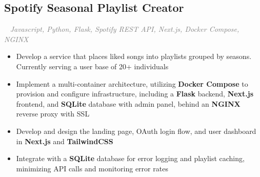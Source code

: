 \documentclass{article}
\newcommand{\projectsection}[3]{
    \subsection*{#1}
    \ 
    \small
    \textcolor{grey}{\emph{#2}}
    \normalsize
    \hfill
    \textcolor{black}{#3}
    \small
}
\begin{document}
\projectsection{Spotify Seasonal Playlist Creator}{Javascript, Python, Flask, Spotify REST API, Next.js, Docker Compose, NGINX}{}
\begin{itemize}
    \item Develop a service that places liked songs into playlists grouped by seasons. Currently serving a user base of 20+ individuals
    \item Implement a multi-container architecture, utilizing \textbf{Docker Compose} to provision and configure infrastructure, including a \textbf{Flask} backend, \textbf{Next.js} frontend, and \textbf{SQLite} database with admin panel, behind an \textbf{NGINX} reverse proxy with SSL
    \item Develop and design the landing page, OAuth login flow, and user dashboard in \textbf{Next.js} and \textbf{TailwindCSS}
    \item Integrate with a \textbf{SQLite} database for error logging and playlist caching, minimizing API calls and monitoring error rates
\end{itemize}

\end{document}

